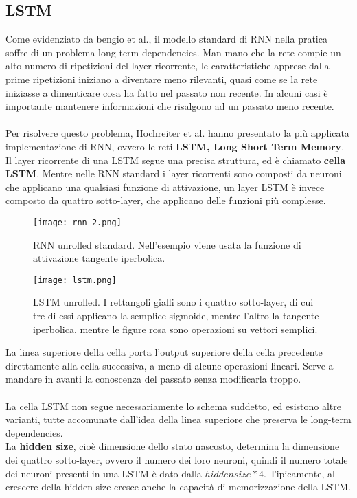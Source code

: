 \subsection{LSTM}
Come evidenziato da bengio et al.\cite{long_term}, il modello standard di RNN nella pratica soffre di un problema long-term dependencies. Man mano che la rete compie un alto numero di ripetizioni del layer ricorrente, le caratteristiche apprese dalla prime ripetizioni iniziano a diventare meno rilevanti, quasi come se la rete iniziasse a dimenticare cosa ha fatto nel passato non recente. In alcuni casi è importante mantenere informazioni che risalgono ad un passato meno recente.\\
\\
Per risolvere questo problema, Hochreiter et al.\cite{lstm} hanno presentato la più applicata implementazione di RNN, ovvero le reti \textbf{LSTM, Long Short Term Memory}.\\
Il layer ricorrente di una LSTM segue una precisa struttura, ed è chiamato \textbf{cella LSTM}. Mentre nelle RNN standard i layer ricorrenti sono composti da neuroni che applicano una qualsiasi funzione di attivazione, un layer LSTM è invece composto da quattro sotto-layer, che applicano delle funzioni più complesse.
\begin{figure}[H]
	\centering
	\texttt{[image: rnn\_2.png]}
	\caption{RNN unrolled standard. Nell'esempio viene usata la funzione di attivazione tangente iperbolica.}
	\label{fig:rnn_2}
\end{figure}
\begin{figure}[H]
	\centering
	\texttt{[image: lstm.png]}
	\caption{LSTM unrolled. I rettangoli gialli sono i quattro sotto-layer, di cui tre di essi applicano la semplice sigmoide, mentre l'altro la tangente iperbolica, mentre le figure rosa sono operazioni su vettori semplici.}
	\label{fig:lstm}
\end{figure}
La linea superiore della cella porta l'output superiore della cella precedente direttamente alla cella successiva, a meno di alcune operazioni lineari. Serve a mandare in avanti la conoscenza del passato senza modificarla troppo.\\
\\
La cella LSTM non segue necessariamente lo schema suddetto, ed esistono altre varianti, tutte accomunate dall'idea della linea superiore che preserva le long-term dependencies.\\
La \textbf{hidden size}, cioè dimensione dello stato nascosto, determina la dimensione dei quattro sotto-layer, ovvero il numero dei loro neuroni, quindi il numero totale dei neuroni presenti in una LSTM è dato dalla $hidden size * 4$. Tipicamente, al crescere della hidden size cresce anche la capacità di memorizzazione della LSTM.

